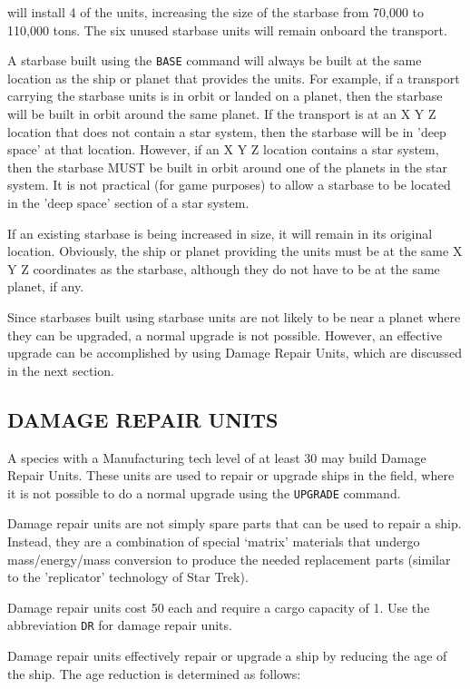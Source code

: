 \documentclass[10pt,titlepage]{article}
\begin{document}
will install 4 of the units, increasing the size of the starbase from 70,000 to
110,000 tons.  The six unused starbase units will remain onboard the transport.

A starbase built using the \texttt{BASE} command will always be built at the same
location as the ship or planet that provides the units.  For example, if a
transport carrying the starbase units is in orbit or landed on a planet, then
the starbase will be built in orbit around the same planet.  If the transport
is at an X Y Z location that does not contain a star system, then the starbase
will be in 'deep space' at that location.  However, if an X Y Z location
contains a star system, then the starbase MUST be built in orbit around one of
the planets in the star system.  It is not practical (for game purposes) to
allow a starbase to be located in the 'deep space' section of a star system.

If an existing starbase is being increased in size, it will remain in its
original location.  Obviously, the ship or planet providing the units must be
at the same X Y Z coordinates as the starbase, although they do not have to be
at the same planet, if any.

Since starbases built using starbase units are not likely to be near a planet
where they can be upgraded, a normal upgrade is not possible.  However, an
effective upgrade can be accomplished by using Damage Repair Units, which are
discussed in the next section.


\subsection{DAMAGE REPAIR UNITS}

A species with a Manufacturing tech level of at least 30 may build Damage
Repair Units.  These units are used to repair or upgrade ships in the field,
where it is not possible to do a normal upgrade using the \texttt{UPGRADE} command.

Damage repair units are not simply spare parts that can be used to repair a
ship.  Instead, they are a combination of special `matrix' materials that
undergo mass/energy/mass conversion to produce the needed replacement parts
(similar to the 'replicator' technology of Star Trek).

Damage repair units cost 50 each and require a cargo capacity of 1.  Use the
abbreviation \texttt{DR} for damage repair units.

Damage repair units effectively repair or upgrade a ship by reducing the age
of the ship.  The age reduction is determined as follows:
\end{document}
